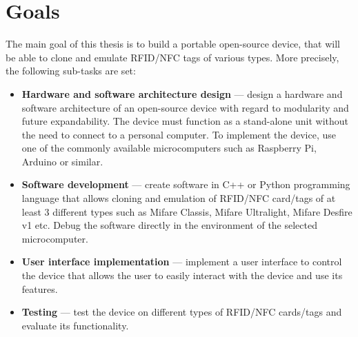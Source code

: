 \chapter{Goals}
\label{chap:goals}

The main goal of this thesis is to build a portable open-source device, that will be able to clone and emulate RFID/NFC tags of various types. More precisely, the following sub-tasks are set:

\begin{itemize}

    \item \textbf{Hardware and software architecture design} --- design a hardware and software architecture of an open-source device with regard to modularity and future expandability. The device must function as a stand-alone unit without the need to connect to a personal computer. To implement the device, use one of the commonly available microcomputers such as Raspberry Pi, Arduino or similar.

    \item \textbf{Software development} --- create software in C++ or Python programming language that allows cloning and emulation of RFID/NFC card/tags of at least 3 different types such as Mifare Classis, Mifare Ultralight, Mifare Desfire v1 etc. Debug the software directly in the environment of the selected microcomputer.

    \item \textbf{User interface implementation} --- implement a user interface to control the device that allows the user to easily interact with the device and use its features.

    \item \textbf{Testing} --- test the device on different types of RFID/NFC cards/tags and evaluate its functionality.

\end{itemize}